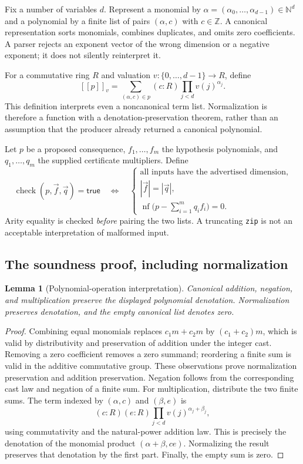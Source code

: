 \documentclass[11pt,letterpaper]{article}
\newcommand{\code}[1]{\nolinkurl{#1}}
\newcommand{\N}{\mathbb N}
\newcommand{\Z}{\mathbb Z}
\newcommand{\den}[1]{[\![#1]\!]}
\newtheorem{lemma}[definition]{Lemma}
\theoremstyle{remark}
\begin{document}
Fix a number of variables $d$. Represent a monomial by
$\alpha=(\alpha_0,\ldots,\alpha_{d-1})\in\N^d$ and a polynomial by a finite
list of pairs $(\alpha,c)$ with $c\in\Z$. A canonical representation sorts
monomials, combines duplicates, and omits zero coefficients. A parser rejects
an exponent vector of the wrong dimension or a negative exponent; it does not
silently reinterpret it.

For a commutative ring $R$ and valuation $v:\{0,\ldots,d-1\}\to R$, define
\[
 \den{p}_v=\sum_{(\alpha,c)\in p}
       (c:R)\prod_{j<d}v(j)^{\alpha_j}.
\]
This definition interprets even a noncanonical term list. Normalization is
therefore a function with a denotation-preservation theorem, rather than an
assumption that the producer already returned a canonical polynomial.

Let $p$ be a proposed consequence, $f_1,\ldots,f_m$ the hypothesis
polynomials, and $q_1,\ldots,q_m$ the supplied certificate multipliers. Define
\[
 \operatorname{check}(p,\vec f,\vec q)=\mathsf{true}
 \quad\Longleftrightarrow\quad
 \begin{cases}
  \text{all inputs have the advertised dimension},\\
  |\vec f|=|\vec q|,\\
  \operatorname{nf}\bigl(p-\sum_{i=1}^m q_i f_i\bigr)=0.
 \end{cases}
\]
Arity equality is checked \emph{before} pairing the two lists. A truncating
\code{zip} is not an acceptable interpretation of malformed input.

\subsection{The soundness proof, including normalization}

\begin{lemma}[Polynomial-operation interpretation]\label{lem:polyops}
Canonical addition, negation, and multiplication preserve the displayed
polynomial denotation. Normalization preserves denotation, and the empty
canonical list denotes zero.
\end{lemma}
\begin{proof}
Combining equal monomials replaces
$c_1m+c_2m$ by $(c_1+c_2)m$, which is valid by distributivity and preservation
of addition under the integer cast. Removing a zero coefficient removes a zero
summand; reordering a finite sum is valid in the additive commutative group.
These observations prove normalization preservation and addition preservation.
Negation follows from the corresponding cast law and negation of a finite sum.
For multiplication, distribute the two finite sums. The term indexed by
$(\alpha,c)$ and $(\beta,e)$ is
\[
 (c:R)(e:R)\prod_{j<d}v(j)^{\alpha_j+\beta_j},
\]
using commutativity and the natural-power addition law. This is precisely the
denotation of the monomial product $(\alpha+\beta,ce)$. Normalizing the
result preserves that denotation by the first part. Finally, the empty sum
is zero.
\end{proof}
\end{document}
